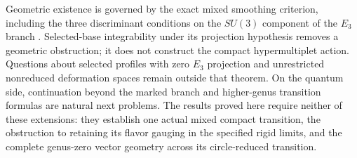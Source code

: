 Geometric existence is governed by the exact mixed smoothing
criterion, including the three discriminant conditions on the
$SU(3)$ component of the $E_3$ branch
\cite{Wuebben:2026smoothing}. Selected-base integrability under its
projection hypothesis removes a geometric obstruction; it does not
construct the compact hypermultiplet action. Questions about selected
profiles with zero $E_3$ projection and unrestricted nonreduced
deformation spaces remain outside that theorem. On the quantum side, continuation beyond the
marked branch and higher-genus transition formulas are natural
next problems. The results proved here require neither of
these extensions: they establish one actual mixed compact
transition, the obstruction to retaining its flavor gauging
in the specified rigid limits, and the complete genus-zero
vector geometry across its circle-reduced transition.
